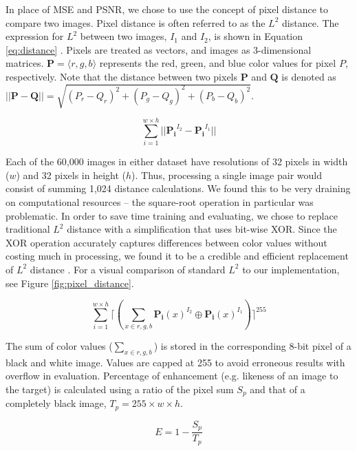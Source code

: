 \documentclass[letterpaper]{article} %
\begin{document}
In place of MSE and PSNR, we chose to use the concept of pixel distance
to compare two images.
Pixel distance is often referred to as the $L^2$ distance.
The expression for $L^2$ between two images, $I_1$ and $I_2$, is
shown in Equation \ref{eq:distance} \cite{graphics}.
Pixels are treated as vectors, and images as
3-dimensional matrices.
$\mathbf{P} = \langle r,g,b \rangle$ represents
the red, green, and blue color values for pixel $P$,
respectively.
Note that the distance between
two pixels $\mathbf{P}$ and $\mathbf{Q}$ is denoted as
$||\mathbf{P} - \mathbf{Q}|| =
\sqrt{(P_r - Q_r)^2 + (P_g - Q_g)^2 + (P_b - Q_b)^2}$.

\begin{equation}
\label{eq:distance}
\sum_{i=1}^{w \times h}||\mathbf{P_i}^{I_2} - \mathbf{P_i}^{I_1}||
\end{equation}

Each of the 60,000 images in either dataset have resolutions of
32 pixels in width ($w$) and 32 pixels in height ($h$).
Thus, processing a single image pair would consist of summing 1,024
distance calculations.
We found this to be very draining on computational resources --
the square-root operation in particular was problematic.
In order to save time training and evaluating, we chose to replace
traditional $L^2$ distance with a simplification that uses bit-wise XOR.
Since the XOR operation accurately captures differences between color
values without costing much in processing,
we found it to be a credible and efficient replacement of $L^2$ distance
\cite{image_analysis}.
For a visual comparison of standard $L^2$ to our implementation,
see Figure \ref{fig:pixel_distance}.

\begin{equation}
\label{eq:xor}
\sum_{i=1}^{w \times h}\lceil(\sum_{x \in r,g,b}\mathbf{P_i}(x)^{I_2} \oplus \mathbf{P_i}(x)^{I_1})\rceil^{255}
\end{equation}

The sum of color values ($\sum_{x \in r,g,b}$) is stored in
the corresponding 8-bit pixel of a black and white image.
Values are capped at 255 to avoid erroneous results with overflow in evaluation.
Percentage of enhancement (e.g. likeness of an image to the target)
is calculated using a ratio of the pixel sum $S_p$
and that of a completely black image, $T_p = 255 \times w \times h$.

\begin{equation}
\label{eq:enhancement}
E = 1 - \frac{S_p}{T_p}
\end{equation}
\end{document}
